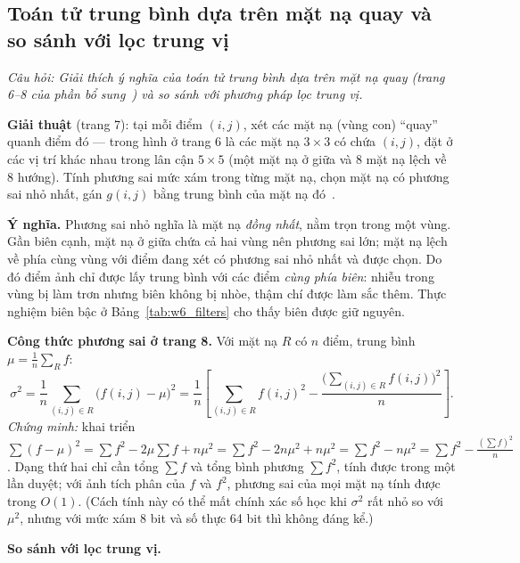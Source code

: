 \subsection{Toán tử trung bình dựa trên mặt nạ quay và so sánh với lọc trung vị}
\label{subsec:w6_rotating_mask}

\textit{Câu hỏi: Giải thích ý nghĩa của toán tử trung bình dựa trên mặt nạ quay (trang 6--8 của phần bổ sung~\citep{xlav_lec5b}) và so sánh với phương pháp lọc trung vị.}

\textbf{Giải thuật} (trang 7): tại mỗi điểm $(i, j)$, xét các mặt nạ (vùng con) ``quay'' quanh điểm đó — trong hình ở trang 6 là các mặt nạ $3 \times 3$ có chứa $(i, j)$, đặt ở các vị trí khác nhau trong lân cận $5 \times 5$ (một mặt nạ ở giữa và $8$ mặt nạ lệch về $8$ hướng). Tính phương sai mức xám trong từng mặt nạ, chọn mặt nạ có phương sai nhỏ nhất, gán $g(i, j)$ bằng trung bình của mặt nạ đó~\citep{nagao1979edge}.

\textbf{Ý nghĩa.} Phương sai nhỏ nghĩa là mặt nạ \emph{đồng nhất}, nằm trọn trong một vùng. Gần biên cạnh, mặt nạ ở giữa chứa cả hai vùng nên phương sai lớn; mặt nạ lệch về phía cùng vùng với điểm đang xét có phương sai nhỏ nhất và được chọn. Do đó điểm ảnh chỉ được lấy trung bình với các điểm \emph{cùng phía biên}: nhiễu trong vùng bị làm trơn nhưng biên không bị nhòe, thậm chí được làm sắc thêm. Thực nghiệm biên bậc ở Bảng~\ref{tab:w6_filters} cho thấy biên được giữ nguyên.

\textbf{Công thức phương sai ở trang 8.} Với mặt nạ $R$ có $n$ điểm, trung bình $\mu = \frac{1}{n}\sum_{R} f$:
\begin{equation}
\sigma^2 = \frac{1}{n}\sum_{(i, j) \in R}\big(f(i, j) - \mu\big)^2 = \frac{1}{n}\left[\sum_{(i, j) \in R} f(i, j)^2 - \frac{\big(\sum_{(i, j) \in R} f(i, j)\big)^2}{n}\right].
\end{equation}
\emph{Chứng minh:} khai triển $\sum (f - \mu)^2 = \sum f^2 - 2\mu\sum f + n\mu^2 = \sum f^2 - 2n\mu^2 + n\mu^2 = \sum f^2 - n\mu^2 = \sum f^2 - \frac{(\sum f)^2}{n}$. Dạng thứ hai chỉ cần tổng $\sum f$ và tổng bình phương $\sum f^2$, tính được trong một lần duyệt; với ảnh tích phân của $f$ và $f^2$, phương sai của mọi mặt nạ tính được trong $O(1)$. (Cách tính này có thể mất chính xác số học khi $\sigma^2$ rất nhỏ so với $\mu^2$, nhưng với mức xám 8 bit và số thực 64 bit thì không đáng kể.)

\textbf{So sánh với lọc trung vị.}

